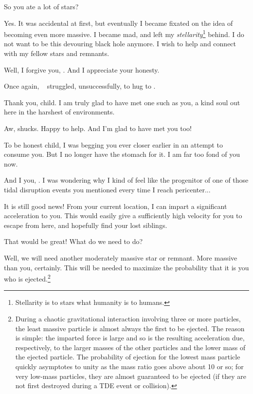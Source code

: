 \documentclass[main.tex]{subfiles}
\begin{document}
\par \Electra So you ate a lot of stars?

\par \Chiron Yes.  It was accidental at first, but eventually I became fixated on the idea of becoming even more massive.  I became mad, and left my \textit{stellarity}\footnote{Stellarity is to stars what humanity is to humans.} behind.  I do not want to be this devouring black hole anymore.  I wish to help and connect with my fellow stars and remnants.  

\par \Electra Well, I forgive you, \rmchiron.  And I appreciate your honesty.

\par \nar Once again, \rmelectra~ struggled, unsuccessfully, to hug to \rmchiron.

\par \Chiron Thank you, child.  I am truly glad to have met one such as you, a kind soul out here in the harshest of environments.

\par \Electra Aw, shucks.  Happy to help.  And I'm glad to have met you too!

\par \Chiron To be honest child, I was begging you ever closer earlier in an attempt to consume you.  But I no longer have the stomach for it.  I am far too fond of you now.

\par \Electra And I you, \rmchiron.  I was wondering why I kind of feel like the progenitor of one of those tidal disruption events you mentioned every time I reach pericenter...

\par \Chiron It is still good news!  From your current location, I can impart a significant acceleration to you.  This would easily give a sufficiently high velocity for you to escape from here, and hopefully find your lost siblings.

\par \Electra  That would be great!  What do we need to do?

\par \Chiron Well, we will need another moderately massive star or remnant.  More massive than you, certainly.  This will be needed to maximize the probability that it is you who is ejected.\footnote{During a chaotic gravitational interaction involving three or more particles, the least massive particle is almost always the first to be ejected.  The reason is simple:  the imparted force is large and so is the resulting acceleration due, respectively, to the larger masses of the other particles and the lower mass of the ejected particle.  The probability of ejection for the lowest mass particle quickly asymptotes to unity as the mass ratio goes above about 10 or so; for very low-mass particles, they are almost guaranteed to be ejected (if they are not first destroyed during a TDE event or collision).}
\end{document}
